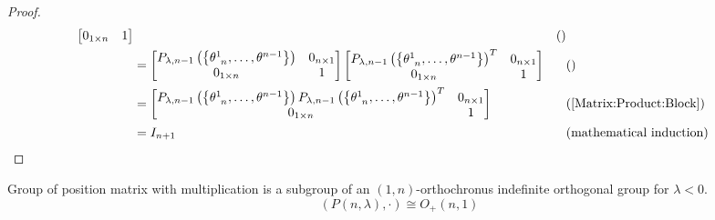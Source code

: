 \documentclass[../main.tex]{subfiles}
\begin{document}
\begin{proof}
\begin{align*}
\begin{bmatrix}
0_{1\times n}&1\\
\end{bmatrix}
&&\text{()}\\
&=
\begin{bmatrix}
P_{\lambda,n-1}\left(\left\{\tensor{\theta}{^1_{n}},\dots,\tensor{\theta}{^{n-1}}\right\}\right)&0_{n\times 1}\\
0_{1\times n}&1\\
\end{bmatrix}
\begin{bmatrix}
P_{\lambda,n-1}\left(\left\{\tensor{\theta}{^1_{n}},\dots,\tensor{\theta}{^{n-1}}\right\}\right)^T&0_{n\times 1}\\
0_{1\times n}&1\\
\end{bmatrix}&&\text{()}\\
&=
\begin{bmatrix}
P_{\lambda,n-1}\left(\left\{\tensor{\theta}{^1_{n}},\dots,\tensor{\theta}{^{n-1}}\right\}\right)P_{\lambda,n-1}\left(\left\{\tensor{\theta}{^1_{n}},\dots,\tensor{\theta}{^{n-1}}\right\}\right)^T&0_{n\times 1}\\
0_{1\times n}&1\\
\end{bmatrix}&&\text{(\cref{Matrix:Product:Block})}\\
&=I_{n+1}&&\text{(mathematical induction)}
\end{align*}
\end{proof}
\begin{proposition}
Group of position matrix with multiplication is a subgroup of an \(\left(1,n\right)\)-orthochronus indefinite orthogonal group for \(\lambda<0\).
\[
\left(P\left(n,\lambda\right),\cdot\right)\cong O_+\left(n,1\right)
\]
\end{proposition}
\end{document}
